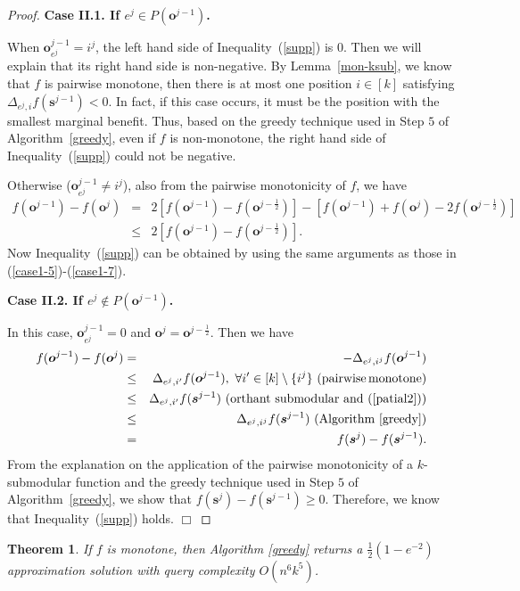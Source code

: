 \documentclass[preprint,12pt]{elsarticle}
\newtheorem{theorem}{Theorem}
\def\bea{\begin{eqnarray}}
\def\eea{\end{eqnarray}}
\def\nn{\nonumber}
\def\endzm{\hfill $\Box$ \bigskip}
\def\bo{\boldsymbol{o}}
\def\bs{\boldsymbol{s}}
\def\bx{\boldsymbol{x}}
\begin{document}
\begin{proof}
\textbf{Case II.1. If %
$e^j\in P(\bo^{j-1})$.} %

When $\bo^{j-1}_{e^j}=i^j$, the left hand side of Inequality~(\ref{supp}) is $0$. Then we will explain that its right hand side is non-negative. By Lemma~\ref{mon-ksub}, we know that $f$ is pairwise monotone,
then there is at most one position $i\in [k]$ satisfying $\Delta_{e^j,i}f(\bs^{j-1})<0$. In fact, if this case occurs, it must be the position with the smallest marginal benefit.
Thus, based on the greedy technique used in Step $5$ of Algorithm~\ref{greedy}, even if $f$ is non-monotone, the right hand side of Inequality~(\ref{supp}) could not be negative.

Otherwise ($\bo^{j-1}_{e^j}\neq i^j$), also from the pairwise monotonicity of $f$,
we have
\bea
f(\bo^{j-1})-f(\bo^j)& = & 2[f(\bo^{j-1})-f(\bo^{j-\frac{1}{2}})]-[f(\bo^{j-1})+f(\bo^j)-2f(\bo^{j-\frac{1}{2}})]\nn\\
& \le & 2[f(\bo^{j-1})-f(\bo^{j-\frac{1}{2}})].\nn
\eea
Now Inequality~(\ref{supp}) can be obtained by using the same arguments as those in (\ref{case1-5})-(\ref{case1-7}).

\textbf{Case II.2. If %
$e^j\notin P(\bo^{j-1})$.} %

In this case, $\bo^{j-1}_{e^j}=0$ and $\bo^{j}=\bo^{j-\frac{1}{2}}$. Then we have
\bea
f(\bo^{j-1})-f(\bo^j) &=&-\Delta_{e^j,i^j} f(\bo^{j-1})\nn\\
&\leq& \Delta_{e^j,i'} f(\bo^{j-1}),\,\,\forall i'\in[k]\setminus\{i^j\} \,\,{\rm (pairwise\, monotone)}\nn \\
&\leq& \Delta_{e^j,i'} f(\bs^{j-1})\,\,({\rm orthant\,\, submodular\,\, and}\,\,(\ref{patial2}))\nn\\
& \leq & \Delta_{e^j,i^j} f(\bs^{j-1})\,\,({\rm Algorithm}~\ref{greedy})\nn\\
& = & f(\bs^j)-f(\bs^{j-1}).\nn
\eea
From the explanation on the application of the pairwise monotonicity of a $k$-submodular function and the greedy technique used in Step $5$ of  Algorithm~\ref{greedy}, we show that $f(\bs^j)-f(\bs^{j-1})\geq 0$. Therefore, we know that Inequality~(\ref{supp}) holds.
\endzm
\end{proof}
\begin{theorem}\label{the1}
If $f$ is monotone, then Algorithm \ref{greedy} returns a $\frac{1}{2}(1-e^{-2})$ approximation solution with query complexity $O(n^6 k^5)$.
\end{theorem}
\end{document}
